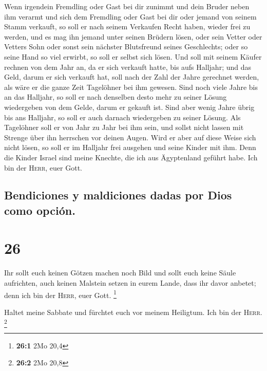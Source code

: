  Wenn irgendein Fremdling oder Gast bei dir zunimmt und
dein Bruder neben ihm verarmt und sich dem Fremdling oder Gast bei dir
oder jemand von seinem Stamm verkauft,  so soll er nach
seinem Verkaufen Recht haben, wieder frei zu werden, und es mag ihn
jemand unter seinen Brüdern lösen,  oder sein Vetter oder
Vetters Sohn oder sonst sein nächster Blutsfreund seines Geschlechts;
oder so seine Hand so viel erwirbt, so soll er selbst sich lösen.
 Und soll mit seinem Käufer rechnen von dem Jahr an, da
er sich verkauft hatte, bis aufs Halljahr; und das Geld, darum er sich
verkauft hat, soll nach der Zahl der Jahre gerechnet werden, als wäre er
die ganze Zeit Tagelöhner bei ihm gewesen.  Sind noch
viele Jahre bis an das Halljahr, so soll er nach denselben desto mehr zu
seiner Lösung wiedergeben von dem Gelde, darum er gekauft ist.
 Sind aber wenig Jahre übrig bis ans Halljahr, so soll er
auch darnach wiedergeben zu seiner Lösung.  Als
Tagelöhner soll er von Jahr zu Jahr bei ihm sein, und sollst nicht
lassen mit Strenge über ihn herrschen vor deinen Augen. 
Wird er aber auf diese Weise sich nicht lösen, so soll er im Halljahr
frei ausgehen und seine Kinder mit ihm.  Denn die Kinder
Israel sind meine Knechte, die ich aus Ägyptenland geführt habe. Ich bin
der \textsc{Herr}, euer Gott.

\hypertarget{bendiciones-y-maldiciones-dadas-por-dios-como-opciuxf3n.}{%
\subsection{Bendiciones y maldiciones dadas por Dios como
opción.}\label{bendiciones-y-maldiciones-dadas-por-dios-como-opciuxf3n.}}

\hypertarget{section-25}{%
\section{26}\label{section-25}}

 Ihr sollt euch keinen Götzen machen noch Bild und sollt
euch keine Säule aufrichten, auch keinen Malstein setzen in eurem Lande,
dass ihr davor anbetet; denn ich bin der \textsc{Herr}, euer Gott.
\footnote{\textbf{26:1} 2Mo 20,4}

 Haltet meine Sabbate und fürchtet euch vor meinem
Heiligtum. Ich bin der \textsc{Herr}. \footnote{\textbf{26:2} 2Mo 20,8}

